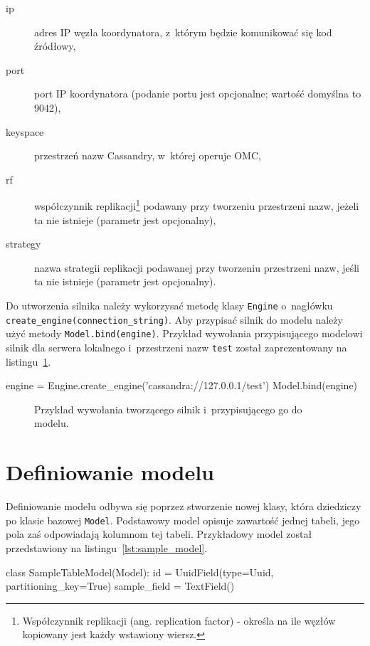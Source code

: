 \begin{description}
	\item[ip] adres IP węzła koordynatora, z~którym będzie komunikować się kod źródłowy,
	\item[port] port IP koordynatora (podanie portu jest opcjonalne; wartość domyślna to 9042),
	\item[keyspace] przestrzeń nazw Cassandry, w~której operuje OMC,
	\item[rf] współczynnik replikacji\footnote{Współczynnik replikacji (ang. replication factor) - określa na ile węzłów kopiowany jest każdy wstawiony wiersz.} podawany przy tworzeniu przestrzeni nazw, jeżeli ta nie istnieje (parametr jest opcjonalny),
	\item[strategy] nazwa strategii replikacji podawanej przy tworzeniu przestrzeni nazw, jeśli ta nie istnieje (parametr jest opcjonalny).
\end{description}

Do utworzenia silnika należy wykorzysać metodę klasy \verb+Engine+ o~nagłówku \verb+create_engine(connection_string)+. Aby przypisać silnik do modelu należy użyć metody \verb+Model.bind(engine)+. Przykład wywołania przypisującego modelowi silnik dla serwera lokalnego i~przestrzeni nazw \verb+test+ został zaprezentowany na listingu~\ref{lst:engine_creation}.

\begin{verbbox}[\footnotesize]
	engine = Engine.create_engine('cassandra://127.0.0.1/test')
	Model.bind(engine)
\end{verbbox}

\begin{figure}[ht!]
	\centering
	\theverbbox
	\caption{Przykład wywołania tworzącego silnik i~przypisującego go do modelu.}
	\label{lst:engine_creation}
\end{figure} 

\section{Definiowanie modelu}
\label{sec:ocm_model_definition}

Definiowanie modelu odbywa się poprzez stworzenie nowej klasy, która dziedziczy po klasie bazowej \verb+Model+. Podstawowy model opisuje zawartość jednej tabeli, jego pola zaś odpowiadają kolumnom tej tabeli. Przykładowy model został przedstawiony na listingu~\ref{lst:sample_model}.

\begin{verbbox}[\footnotesize]
class SampleTableModel(Model):
    id = UuidField(type=Uuid, partitioning_key=True)
    sample_field = TextField()
\end{verbbox}

